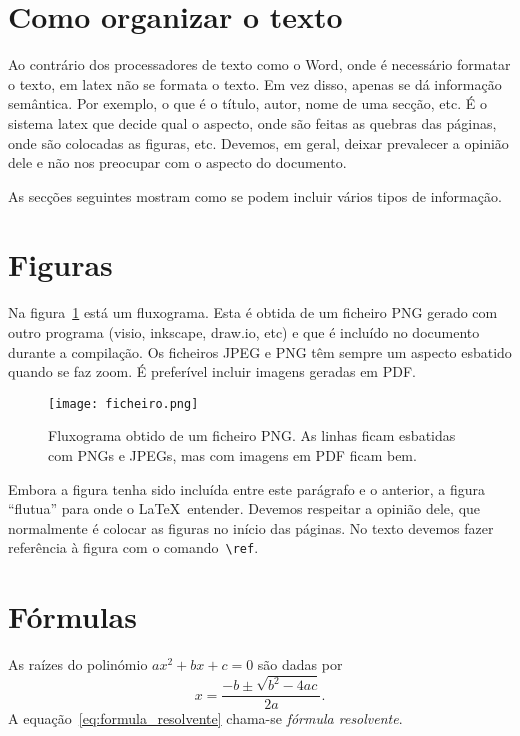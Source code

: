 \documentclass[11pt]{article}   %
\begin{document}
\section{Como organizar o texto}

Ao contrário dos processadores de texto como o Word, onde é necessário formatar o texto, em latex não se formata o texto. Em vez disso, apenas se dá informação semântica. Por exemplo, o que é o título, autor, nome de uma secção, etc. É o sistema latex que decide qual o aspecto, onde são feitas as quebras das páginas, onde são colocadas as figuras, etc. Devemos, em geral, deixar prevalecer a opinião dele e não nos preocupar com o aspecto do documento.

As secções seguintes mostram como se podem incluir vários tipos de informação.

\section{Figuras}
\label{sec:figuras}

Na figura~\ref{fig:fluxo} está um fluxograma. Esta é obtida de um ficheiro PNG gerado com outro programa (visio, inkscape, draw.io, etc) e que é incluído no documento durante a compilação. Os ficheiros JPEG e PNG têm sempre um aspecto esbatido quando se faz zoom. É preferível incluir imagens geradas em PDF.
\begin{figure}
    \centering
    \texttt{[image: ficheiro.png]}
    \caption{Fluxograma obtido de um ficheiro PNG. As linhas ficam esbatidas com PNGs e JPEGs, mas com imagens em PDF ficam bem.}
    \label{fig:fluxo}
\end{figure}

Embora a figura tenha sido incluída entre este parágrafo e o anterior, a figura ``flutua'' para onde o \LaTeX~entender. Devemos respeitar a opinião dele, que normalmente é colocar as figuras no início das páginas. No texto devemos fazer referência à figura com o comando~\lstinline{\ref}.

\section{Fórmulas}
\label{sec:formulas}

As raízes do polinómio $ax^2+bx+c = 0$ são dadas por
\begin{equation}\label{eq:formula_resolvente}
    x = \frac{-b \pm \sqrt{b^2 - 4ac}}{2a}.
\end{equation}
A equação~\eqref{eq:formula_resolvente} chama-se \emph{fórmula resolvente}.
\end{document}
